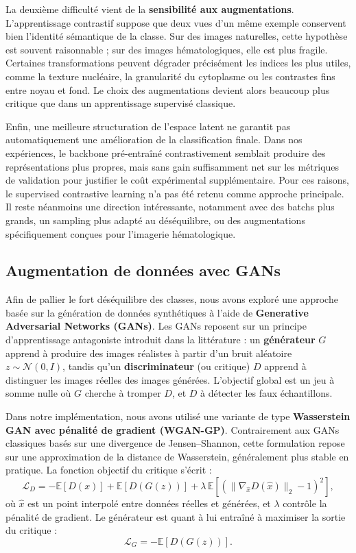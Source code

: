 \documentclass[journal,twocolumn]{IEEEtran}
\begin{document}
La deuxième difficulté vient de la \textbf{sensibilité aux augmentations}. L’apprentissage contrastif suppose que deux vues d’un même exemple conservent bien l’identité sémantique de la classe. Sur des images naturelles, cette hypothèse est souvent raisonnable ; sur des images hématologiques, elle est plus fragile. Certaines transformations peuvent dégrader précisément les indices les plus utiles, comme la texture nucléaire, la granularité du cytoplasme ou les contrastes fins entre noyau et fond. Le choix des augmentations devient alors beaucoup plus critique que dans un apprentissage supervisé classique.

Enfin, une meilleure structuration de l’espace latent ne garantit pas automatiquement une amélioration de la classification finale. Dans nos expériences, le backbone pré-entraîné contrastivement semblait produire des représentations plus propres, mais sans gain suffisamment net sur les métriques de validation pour justifier le coût expérimental supplémentaire. Pour ces raisons, le supervised contrastive learning n’a pas été retenu comme approche principale. Il reste néanmoins une direction intéressante, notamment avec des batchs plus grands, un sampling plus adapté au déséquilibre, ou des augmentations spécifiquement conçues pour l’imagerie hématologique.


\subsection{Augmentation de données avec GANs}

Afin de pallier le fort déséquilibre des classes, nous avons exploré une approche basée sur la génération de données synthétiques à l’aide de \textbf{Generative Adversarial Networks (GANs)}. Les GANs reposent sur un principe d’apprentissage antagoniste introduit dans la littérature : un \textbf{générateur} $G$ apprend à produire des images réalistes à partir d’un bruit aléatoire $z \sim \mathcal{N}(0, I)$, tandis qu’un \textbf{discriminateur} (ou critique) $D$ apprend à distinguer les images réelles des images générées. L’objectif global est un jeu à somme nulle où $G$ cherche à tromper $D$, et $D$ à détecter les faux échantillons.

Dans notre implémentation, nous avons utilisé une variante de type \textbf{Wasserstein GAN avec pénalité de gradient (WGAN-GP)}. Contrairement aux GANs classiques basés sur une divergence de Jensen--Shannon, cette formulation repose sur une approximation de la distance de Wasserstein, généralement plus stable en pratique. La fonction objectif du critique s’écrit :
\begin{equation}
\mathcal{L}_D = -\mathbb{E}[D(x)] + \mathbb{E}[D(G(z))] + \lambda \, \mathbb{E}\left[(\|\nabla_{\hat{x}} D(\hat{x})\|_2 - 1)^2\right],
\end{equation}
où $\hat{x}$ est un point interpolé entre données réelles et générées, et $\lambda$ contrôle la pénalité de gradient. Le générateur est quant à lui entraîné à maximiser la sortie du critique :
\begin{equation}
\mathcal{L}_G = -\mathbb{E}[D(G(z))].
\end{equation}
\end{document}
